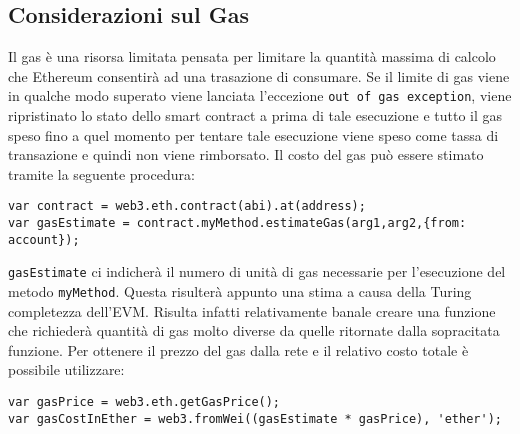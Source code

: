 \subsection*{Considerazioni sul Gas}
Il gas è una risorsa limitata pensata per limitare la quantità massima di calcolo che Ethereum consentirà ad una trasazione di consumare. Se il limite di gas viene in qualche modo superato viene lanciata l'eccezione \lstinline|out of gas exception|, viene ripristinato lo stato dello smart contract a prima di tale esecuzione e tutto il gas speso fino a quel momento per tentare tale esecuzione viene speso come tassa di transazione e quindi non viene rimborsato. Il costo del gas può essere stimato tramite la seguente procedura:
\begin{lstlisting}
var contract = web3.eth.contract(abi).at(address);
var gasEstimate = contract.myMethod.estimateGas(arg1,arg2,{from: account});
\end{lstlisting}
\lstinline|gasEstimate| ci indicherà il numero di unità di gas necessarie per l'esecuzione del metodo \lstinline|myMethod|. Questa risulterà appunto una stima a causa della Turing completezza dell'EVM. Risulta infatti relativamente banale creare una funzione che richiederà quantità di gas molto diverse da quelle ritornate dalla sopracitata funzione. Per ottenere il prezzo del gas dalla rete e il relativo costo totale è possibile utilizzare:
\begin{lstlisting}
var gasPrice = web3.eth.getGasPrice();
var gasCostInEther = web3.fromWei((gasEstimate * gasPrice), 'ether');
\end{lstlisting}

